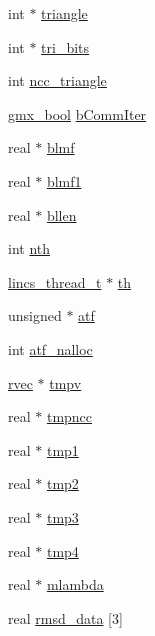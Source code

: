 \begin{DoxyCompactItemize}
\item 
int $\ast$ \hyperlink{structgmx__lincsdata_a6d5e5c671b8bcf7ac7357f418416fece}{triangle}
\item 
int $\ast$ \hyperlink{structgmx__lincsdata_a51db1d8f938cd4557f5903ccfa4e02b4}{tri\-\_\-bits}
\item 
int \hyperlink{structgmx__lincsdata_ae94d4d408e6622688d65f6244733f9a8}{ncc\-\_\-triangle}
\item 
\hyperlink{include_2types_2simple_8h_a8fddad319f226e856400d190198d5151}{gmx\-\_\-bool} \hyperlink{structgmx__lincsdata_a97e4f5c52f18b81e1ea6bc4d630072ef}{b\-Comm\-Iter}
\item 
real $\ast$ \hyperlink{structgmx__lincsdata_aa159e4e45130f32ea336da23bdacd4ad}{blmf}
\item 
real $\ast$ \hyperlink{structgmx__lincsdata_a6427790b26491a0fb997e7c9489b7d0a}{blmf1}
\item 
real $\ast$ \hyperlink{structgmx__lincsdata_ae5a6f7f956c9187c70b319c40a62a53b}{bllen}
\item 
int \hyperlink{structgmx__lincsdata_a7c7ed6b19220c17681786f6f82b558a2}{nth}
\item 
\hyperlink{structlincs__thread__t}{lincs\-\_\-thread\-\_\-t} $\ast$ \hyperlink{structgmx__lincsdata_a6052c08a1a9be413a86e714465214fb8}{th}
\item 
unsigned $\ast$ \hyperlink{structgmx__lincsdata_a03bbceb7bc9b174f8246c86dbed1046f}{atf}
\item 
int \hyperlink{structgmx__lincsdata_adaf7f9b267ad2e5cde915ab800eb6896}{atf\-\_\-nalloc}
\item 
\hyperlink{share_2template_2gromacs_2types_2simple_8h_aa02a552a4abd2f180c282a083dc3a999}{rvec} $\ast$ \hyperlink{structgmx__lincsdata_a0dc05497d46a60eeadb80015e5534408}{tmpv}
\item 
real $\ast$ \hyperlink{structgmx__lincsdata_a9f9dca4538c1bcd6805de7d81a6cde89}{tmpncc}
\item 
real $\ast$ \hyperlink{structgmx__lincsdata_a6fb08b9f7ae5674453fa016eb678170d}{tmp1}
\item 
real $\ast$ \hyperlink{structgmx__lincsdata_a0c79f8a3cd23b5d120d983d8e7e3228b}{tmp2}
\item 
real $\ast$ \hyperlink{structgmx__lincsdata_ae05ba151d39c109598b6465fd3825417}{tmp3}
\item 
real $\ast$ \hyperlink{structgmx__lincsdata_adaa818e4bffd9d9b498abbc2c282162a}{tmp4}
\item 
real $\ast$ \hyperlink{structgmx__lincsdata_a3805432d2c146c3b81de2df8fb4c238b}{mlambda}
\item 
real \hyperlink{structgmx__lincsdata_a2490ee165c3179dde2ca8579bc9b00e3}{rmsd\-\_\-data} \mbox{[}3\mbox{]}
\end{DoxyCompactItemize}


